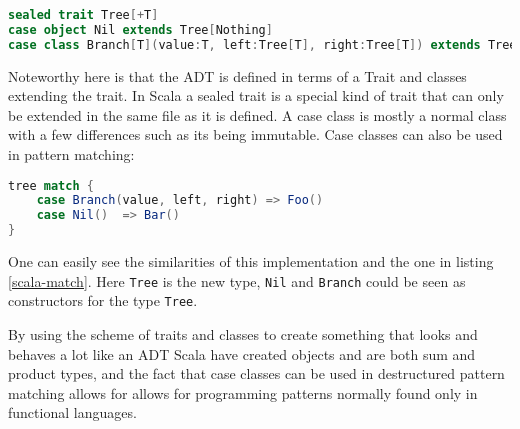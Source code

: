 \documentclass[10pt]{report}
\def\code#1{\texttt{#1}} %
\begin{document}
\begin{lstlisting}[language=Scala,caption={ADT definition in Scala},label={lst:e4c_syntax}]
sealed trait Tree[+T]
case object Nil extends Tree[Nothing]
case class Branch[T](value:T, left:Tree[T], right:Tree[T]) extends Tree[T]
\end{lstlisting}
\par{Noteworthy here is that the ADT is defined in terms of a Trait and classes extending the trait. In Scala a sealed trait is a special kind of trait that can only be extended in the same file as it is defined. A case class is mostly a normal class with a few differences such as its being immutable\cite{ScalaCase}. Case classes can also be used in pattern matching:}
\begin{lstlisting}[language=Scala,caption={Pattern matching on an ADT in Scala},label=scala-match]
tree match {
    case Branch(value, left, right) => Foo()
    case Nil()  => Bar()
}
\end{lstlisting}
\par{One can easily see the similarities of this implementation and the one in listing \ref{scala-match}. Here \code{Tree} is the new type, \code{Nil} and \code{Branch} could be seen as constructors for the type \code{Tree}.}
\par{By using the scheme of traits and classes to create something that looks and behaves a lot like an ADT Scala have created objects and are both sum and product types, and the fact that case classes can be used in destructured pattern matching allows for allows for programming patterns normally found only in functional languages.}
\end{document}
